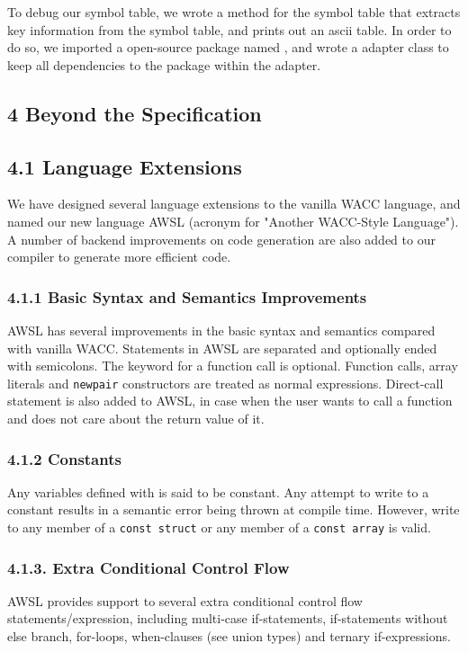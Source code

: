 \documentclass[10pt,a4paper,]{report}
\begin{document}
  To debug our symbol table, we wrote a  method for the symbol
  table that extracts key information from the symbol table, and prints out an
  ascii table. In order to do so, we imported a open-source package named
  , and wrote a adapter class 
  to keep all dependencies to the package within the adapter.

  \subsection*{4 Beyond the Specification}

  \subsection*{4.1 Language Extensions}
  We have designed several language extensions to the vanilla WACC language, and
  named our new language AWSL (acronym for "Another WACC-Style Language"). A
  number of backend improvements on code generation are also added to our
  compiler to generate more efficient code.

  \subsubsection*{4.1.1 Basic Syntax and Semantics Improvements}
  AWSL has several improvements in the basic syntax and semantics compared with
  vanilla WACC. Statements in AWSL are separated and optionally ended with
  semicolons. The  keyword for a function call is optional.
  Function calls, array literals and \texttt{newpair} constructors are treated as normal
  expressions. Direct-call statement is also added to AWSL, in case when the
  user wants to call a function and does not care about the return value of it.

  \subsubsection*{4.1.2 Constants}
  Any variables defined with  is said to be constant. Any attempt
  to write to a constant results in a semantic error being thrown at compile time.
  However, write to any member of a \texttt{const struct} or any member of a
  \texttt{const array} is valid. 

  \subsubsection*{4.1.3. Extra Conditional Control Flow}
  AWSL provides support to several extra conditional control flow
  statements/expression, including multi-case if-statements, if-statements
  without else branch, for-loops, when-clauses (see union types) and ternary
  if-expressions. 
\end{document}
